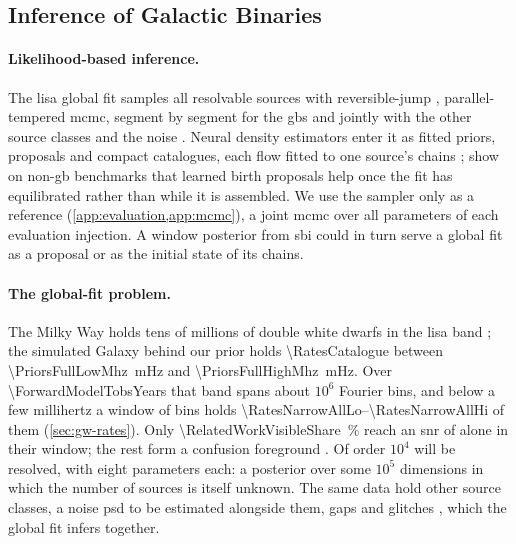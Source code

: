 \subsection{Inference of Galactic Binaries}

\paragraph{Likelihood-based inference.}
The \ac{lisa} global fit samples all resolvable sources with reversible-jump
\citep{green1995reversible}, parallel-tempered \citep{earl2005parallel} \ac{mcmc}, segment by segment
for the \acp{gb} and jointly with the other source classes and the noise
\citep{littenberg2020global,littenberg2023prototype,katz2024efficient,strub2024global,deng2025modular}.
Neural density estimators enter it as fitted priors, proposals and compact catalogues, each flow
fitted to one source's chains \citep{korsakova2024neural}; \citet{sasli2026learned} show on
non-\ac{gb} benchmarks that learned birth proposals help once the fit has equilibrated rather than
while it is assembled. We use the sampler only as a reference (\cref{app:evaluation,app:mcmc}), a
joint \ac{mcmc} over all  parameters of each evaluation injection. A window
posterior from \acs{sbi} could in turn serve a global fit as a proposal or as the initial state of its
chains.

\paragraph{The global-fit problem.}
\label{app:related-globalfit}
The Milky Way holds tens of millions of double white dwarfs in the \ac{lisa} band
\citep{nelemans2001gravitational,korol2017prospects,lamberts2019predicting}; the simulated Galaxy
behind our prior holds \num{\RatesCatalogue} between \qty{\PriorsFullLowMhz}{\milli\hertz} and
\qty{\PriorsFullHighMhz}{\milli\hertz}. Over \qty{\ForwardModelTobsYears}{\year} that band spans
about $10^6$ Fourier bins, and below a few millihertz a window of \RatesNarrowWindow{} bins holds
\numrange{\RatesNarrowAllLo}{\RatesNarrowAllHi} of them (\cref{sec:gw-rates}). Only
\qty{\RelatedWorkVisibleShare}{\percent} reach an \ac{snr} of \RelatedWorkSnrLow{} alone in their window;
the rest form a confusion foreground \citep{timpano2006characterizing,karnesis2021characterization}.
Of order $10^4$ will be resolved, with eight parameters each: a posterior over some $10^5$
dimensions in which the number of sources is itself unknown. The same data hold other source
classes, a noise \ac{psd} to be estimated alongside them, gaps and glitches
\citep{colpi2024lisa,baghi2019gravitational,dey2021effect,baghi2022detection}, which the global fit
infers together.

